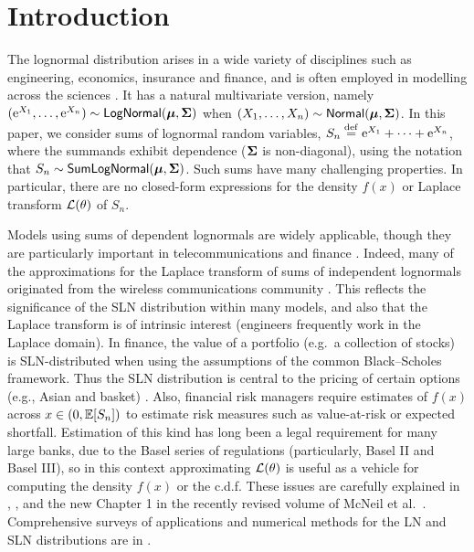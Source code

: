 \section{Introduction}\label{S:Intro}

The lognormal distribution arises in a wide variety of disciplines such as
engineering, economics, insurance and finance, and is often employed in
modelling across the sciences
\cite{aitchison1957lognormal,crow1988lognormal,dufresne2008,
  johnson1994continuous,limpert2001log}. It
has a natural multivariate version, namely $(\mathrm{e}^{X_1}, \dots, \mathrm{e}^{X_n})
\sim\mathsf{LogNormal}(\bm{\mu}, \bm{\Sigma})$ when $(X_1, \dots, X_n) \sim\mathsf{Normal}(\bm{\mu},
\bm{\Sigma})$. In this paper, we consider sums of lognormal random variables,
$S_n \overset{\mathrm{def}}{=} \mathrm{e}^{X_1} + \cdots + \mathrm{e}^{X_n}$, where the summands exhibit
dependence ($\bm{\Sigma}$ is non-diagonal), using the notation that $S_n
\sim\mathsf{SumLogNormal}(\bm{\mu}, \bm{\Sigma})$. Such sums have many challenging properties. In
particular, there are no closed-form expressions for the density $f(x)$ or
Laplace transform $\mathcal{L}(\theta)$ of $S_n$.

Models using sums of dependent lognormals are widely applicable, though they
are particularly important in telecommunications and finance
\cite{dufresne2004log,dufresne2008}. Indeed, many of the approximations
for the Laplace transform of sums of independent lognormals originated from
the wireless communications community \cite{beaulieu1995estimating}. This
reflects the significance of the SLN distribution within many models, and also
that the Laplace transform is of intrinsic interest (engineers frequently work
in the Laplace domain). In finance, the value of a portfolio (e.g.\ a
collection of stocks) is SLN-distributed when using the assumptions of the
common Black--Scholes framework. Thus the SLN distribution is central to the
pricing of certain options (e.g., Asian and basket)
\cite{milevsky1998asian}. Also, financial risk managers require estimates of
$f(x)$ across $x \in (0, \operatorname{{\mathbb E}}[S_n])$ to estimate risk measures such as
value-at-risk or expected shortfall.  Estimation of this kind has long been a
legal requirement for many large banks, due to the Basel series of regulations
(particularly, Basel II and Basel III), so in this context approximating
$\mathcal{L}(\theta)$ is useful as a vehicle for computing the density $f(x)$ or
the c.d.f. These issues are carefully explained in
\cite{duellmann2010regulatory}, \cite{embrechts2014academic}, and the new
Chapter 1 in the recently revised volume of McNeil et
al.\ \cite{mcneil2015quantitative}. Comprehensive surveys of applications and
numerical methods for the LN and SLN distributions are in
\cite{tankov2015tail,asmussen2014laplace,asmussen2015exponential}.

